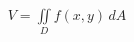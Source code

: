\documentclass[preview]{standalone}
\begin{document}
\begin{align*}
V = \iint\limits_D f(x, y) \, dA
\end{align*}
\end{document}
